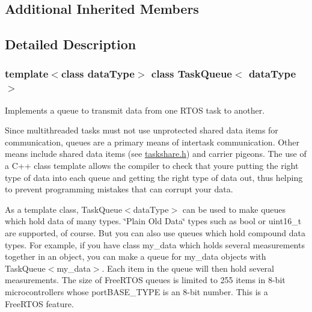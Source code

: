 \subsection*{Additional Inherited Members}


\subsection{Detailed Description}
\subsubsection*{template$<$class data\+Type$>$\newline
class Task\+Queue$<$ data\+Type $>$}

Implements a queue to transmit data from one R\+T\+OS task to another. 

Since multithreaded tasks must not use unprotected shared data items for communication, queues are a primary means of intertask communication. Other means include shared data items (see \mbox{\hyperlink{taskshare_8h}{taskshare.\+h}}) and carrier pigeons. The use of a C++ class template allows the compiler to check that you\textquotesingle{}re putting the right type of data into each queue and getting the right type of data out, thus helping to prevent programming mistakes that can corrupt your data.

As a template class, {\ttfamily Task\+Queue$<$data\+Type$>$} can be used to make queues which hold data of many types. \char`\"{}\+Plain Old Data\char`\"{} types such as {\ttfamily bool} or {\ttfamily uint16\+\_\+t} are supported, of course. But you can also use queues which hold compound data types. For example, if you have {\ttfamily class my\+\_\+data} which holds several measurements together in an object, you can make a queue for {\ttfamily my\+\_\+data} objects with {\ttfamily Task\+Queue$<$my\+\_\+data$>$}. Each item in the queue will then hold several measurements. The size of Free\+R\+T\+OS queues is limited to 255 items in 8-\/bit microcontrollers whose {\ttfamily port\+B\+A\+S\+E\+\_\+\+T\+Y\+PE} is an 8-\/bit number. This is a Free\+R\+T\+OS feature.

